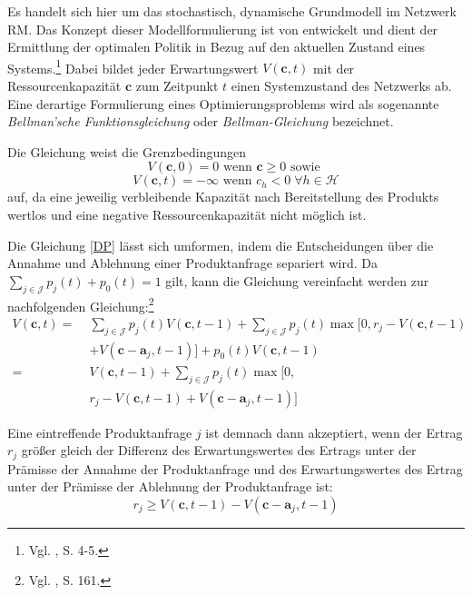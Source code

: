 Es handelt sich hier um das stochastisch, dynamische Grundmodell im Netzwerk RM. Das Konzept dieser Modellformulierung ist von \citeauthor{bellman1954theory} entwickelt und dient der Ermittlung der optimalen Politik in Bezug auf den aktuellen Zustand eines Systems.\footnote{Vgl. \cite{bellman1954theory}, S. 4-5.} Dabei bildet jeder Erwartungswert $V(\textbf{c},t)$ mit der Ressourcenkapazität $\textbf{c}$ zum Zeitpunkt $t$ einen Systemzustand des Netzwerks ab. Eine derartige Formulierung eines Optimierungsproblems wird als sogenannte \textit{Bellman'sche Funktionsgleichung} oder \textit{Bellman-Gleichung} bezeichnet.

Die Gleichung weist die Grenzbedingungen
\begin{equation}\label{GB1}
V(\textbf{c},0)=0 \text{ wenn } \textbf{c}\ge0 \text{ sowie }
\end{equation}
\begin{equation}\label{GB2}
V(\textbf{c},t)=-\infty \text{ wenn } c_{h}<0 \;\forall h\in\mathcal{H}
\end{equation}
auf, da eine jeweilig verbleibende Kapazität nach Bereitstellung des Produkts wertlos und eine negative Ressourcenkapazität nicht möglich ist. 

Die Gleichung \eqref{DP} lässt sich umformen, indem die Entscheidungen über die Annahme und Ablehnung einer Produktanfrage separiert wird. Da $\sum_{j\in \mathcal{J}}p_{j}(t)+p_{0}(t)=1$ gilt, kann die Gleichung vereinfacht werden zur nachfolgenden Gleichung:\footnote{Vgl. \cite{Spengler:2007aa}, S. 161.}
\begin{equation}\label{DP2}
\begin{alignat*}{2}
V(\textbf{c},t)=\;& \sum_{j\in\mathcal{J}}p_{j}(t) V(\textbf{c},t-1)+ \sum_{j\in\mathcal{J}}p_{j}(t) \max[0,r_{j}-V(\textbf{c},t-1)\\
&+V(\textbf{c}-\textbf{a}_{j},t-1)]+p_{0}(t)V(\textbf{c},t-1)\\
=\;& V(\textbf{c},t-1) + \sum_{j\in\mathcal{J}}p_{j}(t) \max[0,\\
&  r_{j}-V(\textbf{c},t-1)+V(\textbf{c}-\textbf{a}_{j},t-1)]
\end{alignat*}
\end{equation}

Eine eintreffende Produktanfrage $j$ ist demnach dann akzeptiert, wenn der Ertrag $r_{j}$ größer gleich der Differenz des Erwartungswertes des Ertrags unter der Prämisse der Annahme der Produktanfrage und des Erwartungswertes des Ertrag unter der Prämisse der Ablehnung der Produktanfrage ist:
\begin{equation}\label{r}
r_{j} \ge V(\textbf{c},t-1)-V(\textbf{c}-\textbf{a}_{j},t-1)
\end{equation}

